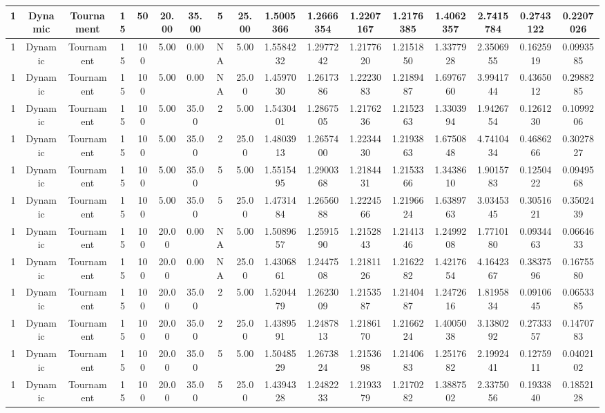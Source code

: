 \begin{longtable}{ | c | c | c | c | c | c | c | c | c | c | c | c | c | c | c | c | c | }
	\hline
	1	&	Dynamic	&	Tournament	&	15	&	50	&	20.00	&	35.00	&	5	&	25.00	&	1.5005366	&	1.2666354	&	1.2207167	&	1.2176385	&	1.4062357	&	2.7415784	&	0.2743122	&	0.2207026 \\
	\hline
	1	&	Dynamic	&	Tournament	&	15	&	100	&	5.00	&	0.00	&	NA	&	5.00	&	1.5584232	&	1.2977242	&	1.2177620	&	1.2151850	&	1.3377928	&	2.3506955	&	0.1625919	&	0.0993585 \\
	\hline
	1	&	Dynamic	&	Tournament	&	15	&	100	&	5.00	&	0.00	&	NA	&	25.00	&	1.4597030	&	1.2617386	&	1.2223083	&	1.2189487	&	1.6976760	&	3.9941744	&	0.4365012	&	0.2988285 \\
	\hline
	1	&	Dynamic	&	Tournament	&	15	&	100	&	5.00	&	35.00	&	2	&	5.00	&	1.5430401	&	1.2867505	&	1.2176236	&	1.2152363	&	1.3303994	&	1.9426754	&	0.1261230	&	0.1099206 \\
	\hline
	1	&	Dynamic	&	Tournament	&	15	&	100	&	5.00	&	35.00	&	2	&	25.00	&	1.4803913	&	1.2657400	&	1.2234430	&	1.2193863	&	1.6750848	&	4.7410434	&	0.4686266	&	0.3027827 \\
	\hline
	1	&	Dynamic	&	Tournament	&	15	&	100	&	5.00	&	35.00	&	5	&	5.00	&	1.5515495	&	1.2900368	&	1.2184431	&	1.2153366	&	1.3438610	&	1.9015783	&	0.1250422	&	0.0949568 \\
	\hline
	1	&	Dynamic	&	Tournament	&	15	&	100	&	5.00	&	35.00	&	5	&	25.00	&	1.4731484	&	1.2656088	&	1.2224566	&	1.2196624	&	1.6389763	&	3.0345345	&	0.3051621	&	0.3502439 \\
	\hline
	1	&	Dynamic	&	Tournament	&	15	&	100	&	20.00	&	0.00	&	NA	&	5.00	&	1.5089657	&	1.2591590	&	1.2152843	&	1.2141346	&	1.2499208	&	1.7710180	&	0.0934463	&	0.0664633 \\
	\hline
	1	&	Dynamic	&	Tournament	&	15	&	100	&	20.00	&	0.00	&	NA	&	25.00	&	1.4306861	&	1.2447508	&	1.2181126	&	1.2162282	&	1.4217654	&	4.1642367	&	0.3837596	&	0.1675580 \\
	\hline
	1	&	Dynamic	&	Tournament	&	15	&	100	&	20.00	&	35.00	&	2	&	5.00	&	1.5204479	&	1.2623009	&	1.2153587	&	1.2140487	&	1.2472616	&	1.8195834	&	0.0910645	&	0.0653385 \\
	\hline
	1	&	Dynamic	&	Tournament	&	15	&	100	&	20.00	&	35.00	&	2	&	25.00	&	1.4389591	&	1.2487813	&	1.2186170	&	1.2166224	&	1.4005038	&	3.1380292	&	0.2733357	&	0.1470783 \\
	\hline
	1	&	Dynamic	&	Tournament	&	15	&	100	&	20.00	&	35.00	&	5	&	5.00	&	1.5048529	&	1.2673824	&	1.2153698	&	1.2140683	&	1.2517682	&	2.1992441	&	0.1275911	&	0.0402102 \\
	\hline
	1	&	Dynamic	&	Tournament	&	15	&	100	&	20.00	&	35.00	&	5	&	25.00	&	1.4394328	&	1.2482233	&	1.2193379	&	1.2170282	&	1.3887502	&	2.3375056	&	0.1933840	&	0.1852128 \\

\end{longtable}
